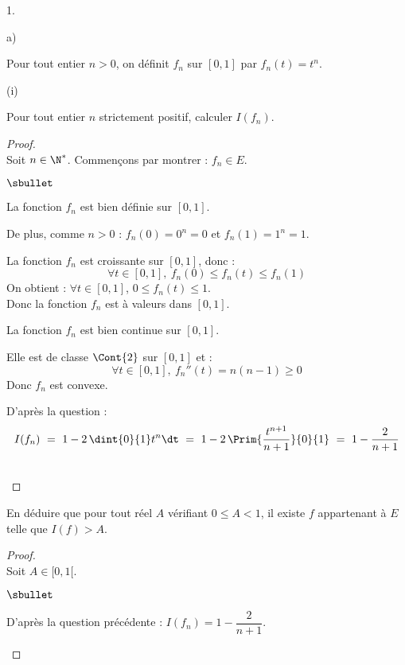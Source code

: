\documentclass[11pt]{article}%
\begin{document}
\begin{noliste}{1.}
\begin{noliste}{a)}
  
  \item Pour tout entier $n >0$, on définit $f_n$ sur $[0,1]$ par 
  $f_n(t)=t^n$.
  \begin{nonoliste}{(i)}
    \item Pour tout entier $n$ strictement positif, calculer $I(f_n)$.
    
    \begin{proof}~\\
    Soit $n\in \N^*$.
	Commençons par montrer : $f_n \in E$.
	\begin{noliste}{$\sbullet$}
	  \item La fonction $f_n$ est bien définie sur $[0,1]$.
	  \item De plus, comme $n>0$ : $f_n(0)=0^n=0$ et $f_n(1)=1^n=1$.
	  
	  \item La fonction $f_n$ est croissante sur $[0,1]$, donc :
	  \[
	    \forall t\in [0,1], \ f_n(0) \leq f_n(t) \leq f_n(1)
	  \]
	  On obtient : $\forall t\in [0,1]$, $0 \leq f_n(t) \leq 
	  1$.\\
	  Donc la fonction $f_n$ est à valeurs dans $[0,1]$.
	  \item La fonction $f_n$ est bien continue sur $[0,1]$.
	  \item Elle est de classe $\Cont{2}$ sur $[0,1]$ et :
	  \[
	    \forall t \in [0,1], \ f_n''(t)=n(n-1)\geq 0
	  \]
	  Donc $f_n$ est convexe.
	\end{noliste}
	
	
	
	
      D'après la question  :
      \[
        I(f_n) \ = \ 1-2\, \dint{0}{1} t^n \dt \ = \ 1- 2 \, \Prim{
        \dfrac{t^{n+1}}{n+1}}{0}{1} \ = \ 1 - \dfrac{2}{n+1}
      \]
      
      ~\\[-1.4cm]
    \end{proof}

    
    \item En déduire que pour tout réel $A$ vérifiant $0 \leq A <1$, il 
    existe $f$ appartenant à $E$ telle que $I(f)>A$. 
    
    \begin{proof}~\\
      Soit $A \in [0,1[$.
	\begin{noliste}{$\sbullet$}
	  \item D'après la question précédente : 
	  $I(f_n)=1-\dfrac{2}{n+1}$.
	  

\end{noliste}
\end{proof}
\end{nonoliste}
\end{noliste}
\end{noliste}
\end{document}
